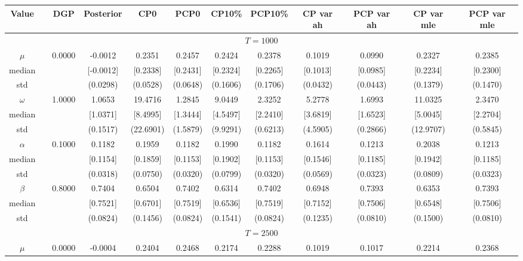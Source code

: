 { \renewcommand{\arraystretch}{1.2} 
\begin{sidewaystable} 
\center 
\begin{tabular}{cc cc| cccc| cccc} 
Value && DGP & Posterior & CP0  & PCP0 & CP10\%  & PCP10\% &CP var ah & PCP var ah & CP var mle & PCP var mle \\ \hline 
\hline 
\multicolumn{12}{c}{$T =1000$}  \\ 
\hline 
 \rowcolor{LightCyan} 
$\mu$&& 0.0000 & -0.0012 & 0.2351 & 0.2457 & 0.2424 & 0.2378 & 0.1019 & 0.0990 & 0.2327 & 0.2385  \\   
median &&  & [-0.0012] & [0.2338] & [0.2431] & [0.2324] & [0.2265] & [0.1013] & [0.0985] & [0.2234] & [0.2300]  \\ 
std &&   & (0.0298) & (0.0528) & (0.0648) & (0.1606) & (0.1706) &(0.0432) & (0.0443) & (0.1379) & (0.1470)  \\ 
 \rowcolor{LightCyan} 
$\omega$&& 1.0000 & 1.0653 & 19.4716 & 1.2845 & 9.0449 & 2.3252 & 5.2778 & 1.6993 & 11.0325 & 2.3470  \\   
median &&  & [1.0371] & [8.4995] & [1.3444] & [4.5497] & [2.2410] & [3.6819] & [1.6523] & [5.0045] & [2.2704]  \\ 
std &&   & (0.1517) & (22.6901) & (1.5879) & (9.9291) & (0.6213) &(4.5905) & (0.2866) & (12.9707) & (0.5845)  \\ 
 \rowcolor{LightCyan} 
$\alpha$&& 0.1000 & 0.1182 & 0.1959 & 0.1182 & 0.1990 & 0.1182 & 0.1614 & 0.1213 & 0.2038 & 0.1213  \\   
median &&  & [0.1154] & [0.1859] & [0.1153] & [0.1902] & [0.1153] & [0.1546] & [0.1185] & [0.1942] & [0.1185]  \\ 
std &&   & (0.0318) & (0.0750) & (0.0320) & (0.0799) & (0.0320) &(0.0569) & (0.0323) & (0.0809) & (0.0323)  \\ 
 \rowcolor{LightCyan} 
$\beta$&& 0.8000 & 0.7404 & 0.6504 & 0.7402 & 0.6314 & 0.7402 & 0.6948 & 0.7393 & 0.6353 & 0.7393  \\   
median &&  & [0.7521] & [0.6701] & [0.7519] & [0.6536] & [0.7519] & [0.7152] & [0.7506] & [0.6548] & [0.7506]  \\ 
std &&   & (0.0824) & (0.1456) & (0.0824) & (0.1541) & (0.0824) &(0.1235) & (0.0810) & (0.1500) & (0.0810)  \\ 
\hline 
\multicolumn{12}{c}{$T =2500$}  \\ 
\hline 
 \rowcolor{LightCyan} 
$\mu$&& 0.0000 & -0.0004 & 0.2404 & 0.2468 & 0.2174 & 0.2288 & 0.1019 & 0.1017 & 0.2214 & 0.2368  \\   

\end{tabular}
\end{sidewaystable}}
